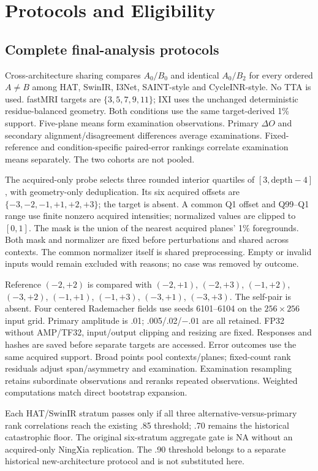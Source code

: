\section{Protocols and Eligibility}
\subsection{Complete final-analysis protocols}
Cross-architecture sharing compares $A_0/B_0$ and identical $A_0/B_2$ for every ordered $A\ne B$ among HAT, SwinIR, I3Net, SAINT-style and CycleINR-style. No TTA is used. fastMRI targets are $\{3,5,7,9,11\}$; IXI uses the unchanged deterministic residue-balanced geometry. Both conditions use the same target-derived 1\% support. Five-plane means form examination observations. Primary $\Delta O$ and secondary alignment/disagreement differences average examinations. Fixed-reference and condition-specific paired-error rankings correlate examination means separately. The two cohorts are not pooled.

The acquired-only probe selects three rounded interior quartiles of $[3,\mathrm{depth}-4]$, with geometry-only deduplication. Its six acquired offsets are $\{-3,-2,-1,+1,+2,+3\}$; the target is absent. A common Q1 offset and Q99--Q1 range use finite nonzero acquired intensities; normalized values are clipped to $[0,1]$. The mask is the union of the nearest acquired planes' 1\% foregrounds. Both mask and normalizer are fixed before perturbations and shared across contexts. The common normalizer itself is shared preprocessing. Empty or invalid inputs would remain excluded with reasons; no case was removed by outcome.

Reference $(-2,+2)$ is compared with $(-2,+1)$, $(-2,+3)$, $(-1,+2)$, $(-3,+2)$, $(-1,+1)$, $(-1,+3)$, $(-3,+1)$, $(-3,+3)$. The self-pair is absent. Four centered Rademacher fields use seeds 6101--6104 on the $256\times256$ input grid. Primary amplitude is .01; .005/.02/$-.01$ are all retained. FP32 without AMP/TF32, input/output clipping and resizing are fixed. Responses and hashes are saved before separate targets are accessed. Error outcomes use the same acquired support. Broad points pool contexts/planes; fixed-count rank residuals adjust span/asymmetry and examination. Examination resampling retains subordinate observations and reranks repeated observations. Weighted computations match direct bootstrap expansion.

Each HAT/SwinIR stratum passes only if all three alternative-versus-primary rank correlations reach the existing .85 threshold; .70 remains the historical catastrophic floor. The original six-stratum aggregate gate is NA without an acquired-only NingXia replication. The .90 threshold belongs to a separate historical new-architecture protocol and is not substituted here.

